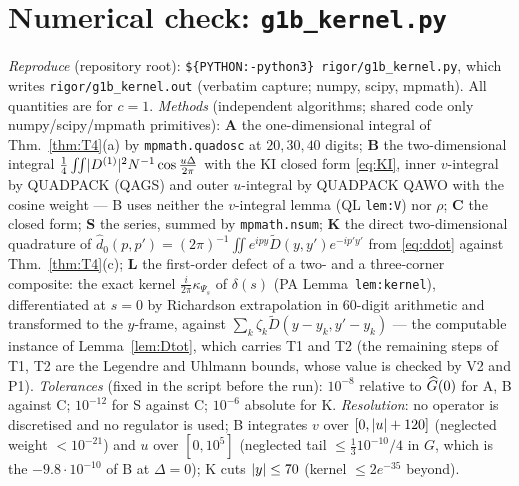 \documentclass[11pt]{article}
\theoremstyle{definition}\newtheorem{hypothesis}[theorem]{Hypothesis}
\begin{document}
\section{Numerical check: \texttt{g1b\_kernel.py}}\label{sec:num}
\emph{Reproduce} (repository root): \texttt{\$\{PYTHON:-python3\} rigor/g1b\_kernel.py}, which writes
\texttt{rigor/g1b\_kernel.out} (verbatim capture; numpy, scipy, mpmath).  All quantities are for $c=1$.
\emph{Methods} (independent algorithms; shared code only numpy/scipy/mpmath primitives): \textbf{A} the
one-dimensional integral of Thm.~\ref{thm:T4}(a) by \texttt{mpmath.quadosc} at $20,30,40$ digits; \textbf{B}
the two-dimensional integral $\frac14\iint\lvert D^{(1)}\rvert^2N^{-1}\cos\frac{u\Delta}{2\pi}$ with the KI closed form
\eqref{eq:KI}, inner $v$-integral by QUADPACK (QAGS) and outer $u$-integral by QUADPACK QAWO with the
cosine weight --- B uses neither the $v$-integral lemma (QL \texttt{lem:V}) nor $\rho$; \textbf{C} the closed
form; \textbf{S} the series, summed by \texttt{mpmath.nsum}; \textbf{K} the direct two-dimensional quadrature of
$\hat d_0(p,p')=(2\pi)^{-1}\iint e^{ipy}\widetilde D(y,y')e^{-ip'y'}$ from \eqref{eq:ddot} against
Thm.~\ref{thm:T4}(c); \textbf{L} the first-order defect of a two- and a three-corner composite: the exact
kernel $\frac i{2\pi}\kappa_{\Psi_s}$ of $\delta(s)$ (PA Lemma~\texttt{lem:kernel}), differentiated at $s=0$ by
Richardson extrapolation in 60-digit arithmetic and transformed to the $y$-frame, against
$\sum_k\zeta_k\widetilde D(y-y_k,y'-y_k)$ --- the computable instance of Lemma~\ref{lem:Dtot}, which carries
T1 and T2 (the remaining steps of T1, T2 are the Legendre and Uhlmann bounds, whose value is checked by V2 and
P1).  \emph{Tolerances} (fixed in the script before the run): $10^{-8}$ relative to $\widehat G(0)$ for
A, B against C; $10^{-12}$ for S against C; $10^{-6}$ absolute for K.  \emph{Resolution}: no operator is
discretised and no regulator is used; B integrates $v$ over $[0,\lvert u\rvert+120]$ (neglected weight $<10^{-21}$) and
$u$ over $[0,10^5]$ (neglected tail $\le\frac13 10^{-10}/4$ in $G$, which is the $-9.8\cdot10^{-10}$ of B at
$\Delta=0$); K cuts $\lvert y\rvert\le70$ (kernel $\le2e^{-35}$ beyond).
\end{document}
